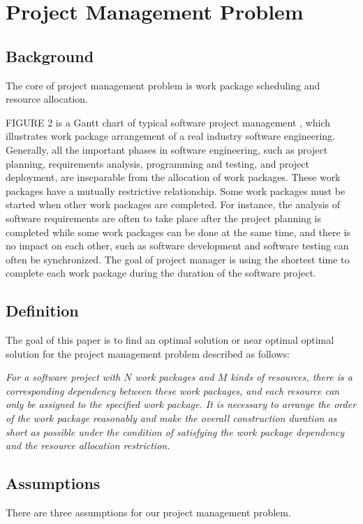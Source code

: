 
\section{Project Management Problem}
%

\subsection{Background}
%

The core of project management problem is work package scheduling and
resource allocation.


FIGURE 2 is a Gantt chart of typical software project management , which 
illustrates work package arrangement of a real industry software 
engineering.  Generally, all the important phases in software engineering, 
such as project planning, requirements analysis, programming and testing, and 
project deployment, are inseparable from the allocation of work packages.  
These work packages have a mutually restrictive relationship. Some work 
packages must be started when other work packages are completed. For 
instance, the analysis of software requirements are often to take place after 
the project planning is completed while some work packages can be done at the 
same time, and there is no impact on each other, such as software development 
and software testing can often be synchronized.  The goal of project manager 
is using the shortest time to complete each work package during the duration 
of the software project.


\subsection{Definition}
%
The goal of this paper is to find an optimal solution or near optimal
optimal solution for the project management problem described as
follows:

\emph{
  For a software project with $N$ work packages and $M$ kinds of
  resources, there is a corresponding dependency between these work
  packages, and each resource can only be assigned to the specified
  work package.  It is necessary to arrange the order of the work
  package reasonably and make the overall construction duration as short
  as possible under the condition of satisfying the work package
  dependency and the resource allocation restriction.
}


\subsection{Assumptions}
%
There are three assumptions for our project management problem.

